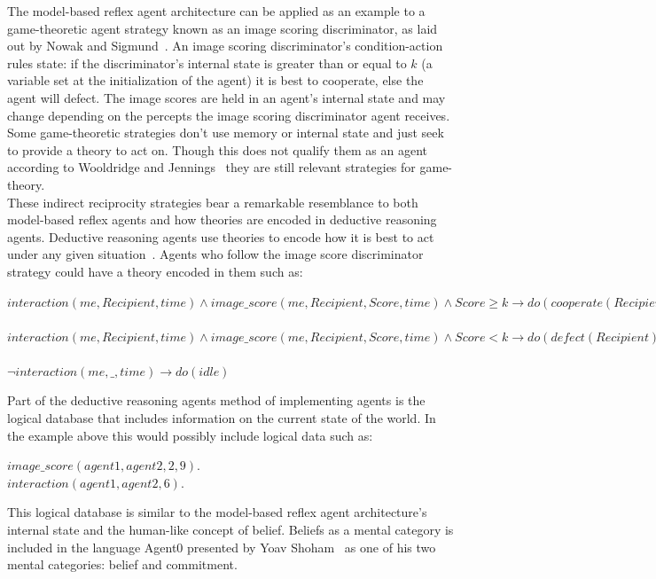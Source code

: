 \documentclass[twoside,twocolumn]{article}
\begin{document}
\noindent The model-based reflex agent architecture can be applied as an example to a game-theoretic agent strategy known as an image scoring discriminator, as laid out by Nowak and Sigmund~\cite{evol_indirect_image}. An image scoring discriminator's condition-action rules state: if the discriminator's internal state is greater than or equal to $k$ (a variable set at the initialization of the agent) it is best to cooperate, else the agent will defect. The image scores are held in an agent's internal state and may change depending on the percepts the image scoring discriminator agent receives.\\
Some game-theoretic strategies don't use memory or internal state and just seek to provide a theory to act on. Though this does not qualify them as an agent according to Wooldridge and Jennings~\cite{wooldridge_jennings_1995} they are still relevant strategies for game-theory.\\
These indirect reciprocity strategies bear a remarkable resemblance to both model-based reflex agents and how theories are encoded in deductive reasoning agents. Deductive reasoning agents use theories to encode how it is best to act under any given situation~\cite{kostas_deductive}. Agents who follow the image score discriminator strategy could have a theory encoded in them such as:
\begin{framed}
\noindent$interaction(me, Recipient, time) \wedge image\_score(me, Recipient, Score, time) \wedge Score\geq k \to do(cooperate(Recipient))$\\\\
$interaction(me, Recipient, time) \wedge image\_score(me, Recipient, Score, time) \wedge Score<k \to do(defect(Recipient))$\\\\
$\neg interaction(me, \_, time) \to do(idle)$
\end{framed}
\noindent Part of the deductive reasoning agents method of implementing agents is the logical database that includes information on the current state of the world. In the example above this would possibly include logical data such as:
\begin{framed}
\begin{center}
$image\_score(agent1, agent2, 2, 9).$ \\
$interaction(agent1, agent2, 6).$
\end{center}
\end{framed}
\noindent This logical database is similar to the model-based reflex agent architecture's internal state and the human-like concept of belief. Beliefs as a mental category is included in the language Agent0 presented by Yoav Shoham~\cite{shoham1991agent0} as one of his two mental categories: belief and commitment.\\
\end{document}
